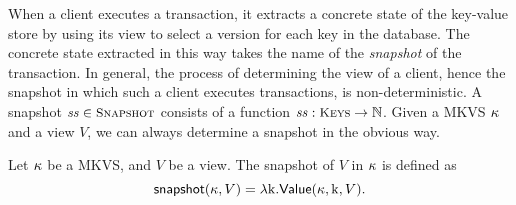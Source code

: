 
%

When a client executes a transaction, it extracts a concrete state of the key-value store by using its view 
to select a version for each key in the database. The concrete state extracted in this way takes the name of the 
\emph{snapshot} of the transaction. In general, the process of determining the view of a client, 
hence the snapshot in which such a client executes transactions, is non-deterministic.
A snapshot 
$\h \in \Heaps$ consists of a function 
$\h: \Addr \rightarrow \Nat$. 
Given a MKVS $\kappa$ and a view $V$, we can always determine a snapshot in 
the obvious way. 

\begin{definition}
\label{def:snapshot}
Let $\kappa$ be a MKVS, and $V$ be a view. The snapshot of 
$V$ in $\kappa$ is defined as
\[
\mathsf{snapshot}(\kappa, V) = \lambda \mathrm{k}. \mathsf{Value}(\kappa, \mathrm{k}, V).
\]
\end{definition}



